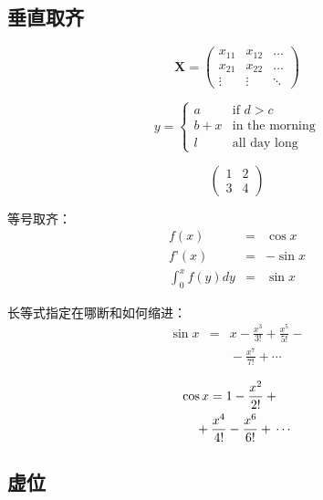 \documentclass[a4paper,12pt]{article}
\begin{document}
\subsection{垂直取齐}

\begin{displaymath}
\mathbf{X} =
\left( \begin{array}{ccc}
x_{11} & x_{12} & \ldots \\
x_{21} & x_{22} & \ldots \\
\vdots & \vdots & \ddots
\end{array} \right)
\end{displaymath}

\begin{displaymath}
y = \left\{ \begin{array}{ll}
a & \textrm{if $d>c$}\\
b+x & \textrm{in the morning}\\
l & \textrm{all day long}
\end{array} \right.
\end{displaymath}

\begin{displaymath}
\left(\begin{array}{c|c}
1 & 2 \\
\hline
3 & 4
\end{array}\right)
\end{displaymath}

等号取齐：
\begin{eqnarray}
f(x) & = & \cos x
\\
f’(x) & = & -\sin x
\\
\int_{0}^{x} f(y)dy &
= & \sin x
\end{eqnarray}

长等式指定在哪断和如何缩进：
{\setlength\arraycolsep{2pt}
\begin{eqnarray}
\sin x & = & x -\frac{x^{3}}{3!}
+\frac{x^{5}}{5!}-{}
\nonumber\\
&& {}-\frac{x^{7}}{7!}+{}\cdots
\end{eqnarray}}

\begin{eqnarray}
\lefteqn{ \cos x = 1
-\frac{x^{2}}{2!} +{} }
\nonumber\\
& & {}+\frac{x^{4}}{4!}
-\frac{x^{6}}{6!}+{}\cdots
\end{eqnarray}

\subsection{虚位}
\end{document}

